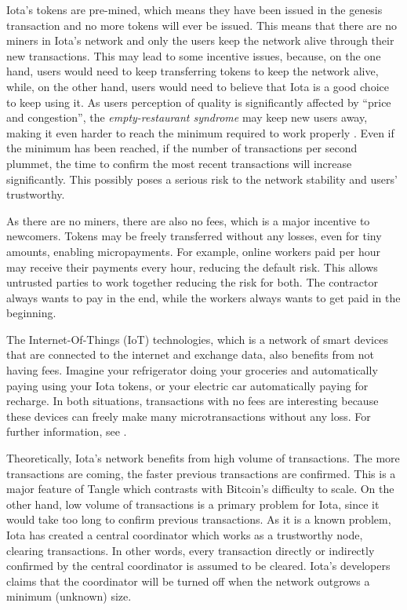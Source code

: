 Iota's tokens are pre-mined, which means they have been issued in the genesis transaction and no more tokens will ever be issued. This means that there are no miners in Iota's network and only the users keep the network alive through their new transactions. This may lead to some incentive issues, because, on the one hand, users would need to keep transferring tokens to keep the network alive, while, on the other hand, users would need to believe that Iota is a good choice to keep using it. As users perception of quality is significantly affected by ``price and congestion'', the \emph{empty-restaurant syndrome} may keep new users away, making it even harder to reach the minimum required to work properly \citep{debo2010prices}. Even if the minimum has been reached, if the number of transactions per second plummet, the time to confirm the most recent transactions will increase significantly. This possibly poses a serious risk to the network stability and users' trustworthy.

As there are no miners, there are also no fees, which is a major incentive to newcomers. Tokens may be freely transferred without any losses, even for tiny amounts, enabling micropayments. For example, online workers paid per hour may receive their payments every hour, reducing the default risk. This allows untrusted parties to work together reducing the risk for both. The contractor always wants to pay in the end, while the workers always wants to get paid in the beginning.

The Internet-Of-Things (IoT) technologies, which is a network of smart devices that are connected to the internet and exchange data, also benefits from not having fees. Imagine your refrigerator doing your groceries and automatically paying using your Iota tokens, or your electric car automatically paying for recharge. In both situations, transactions with no fees are interesting because these devices can freely make many microtransactions without any loss. For further information, see \cite{fleisch2010internet}.

Theoretically, Iota's network benefits from high volume of transactions. The more transactions are coming, the faster previous transactions are confirmed. This is a major feature of Tangle which contrasts with Bitcoin's difficulty to scale. On the other hand, low volume of transactions is a primary problem for Iota, since it would take too long to confirm previous transactions. As it is a known problem, Iota has created a central coordinator which works as a trustworthy node, clearing transactions. In other words, every transaction directly or indirectly confirmed by the central coordinator is assumed to be cleared. Iota's developers claims that the coordinator will be turned off when the network outgrows a minimum (unknown) size.

